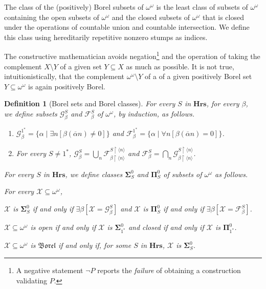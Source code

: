 \documentclass[a4paper]{amsart}
\theoremstyle{plain}
\newtheorem{definition}{Definition}
\begin{document}
The class of the (positively) Borel subsets of $\omega^\omega$ is the least class of subsets of $\omega^\omega$ containing the open subsets of $\omega^\omega$ and the closed subsets of $\omega^\omega$ that is  closed under the operations of countable union and countable intersection. We define this class using hereditarily repetitive nonzero stumps as indices.

The constructive mathematician avoids  negation\footnote{A negative statement $\neg P$ reports the {\it failure} of obtaining a construction validating $P$.} and the operation of taking the complement $X\setminus Y$ of a given set $Y\subseteq X$ as much as possible. It is not true, intuitionistically, that the complement $\omega^\omega\setminus Y$ of a of a given positively Borel set $Y\subseteq \omega^\omega$  is again positively Borel.

\begin{definition}[Borel sets and Borel classes] For every  $S$ in $\mathbf{Hrs}$, for every $\beta$, \\we define subsets $\mathcal{G}^S_\beta$ and $\mathcal{F}^S_\beta$ of $\omega^\omega$,  by induction, as follows.

\begin{enumerate}[\upshape (i)] \item $\mathcal{G}^{1^\ast}_\beta =\{\alpha\mid \exists n[\beta (\overline \alpha  n) \neq 0]\}$ and $\mathcal{F}^{1^\ast}_\beta =\{\alpha\mid \forall n[\beta (\overline\alpha n) = 0]\}$.

\item For every $S\neq 1^\ast$,
$\mathcal{G}^S_\beta = \bigcup_n \mathcal{F}^{S\upharpoonright\langle n \rangle }_{\beta\upharpoonright \langle n \rangle}$ and  $\mathcal{F}^S_\beta = \bigcap_n \mathcal{G}^{S\upharpoonright\langle n \rangle }_{\beta\upharpoonright \langle n \rangle}$.
\end{enumerate}
\smallskip
For  every $S$ in $\mathbf{Hrs}$, we define classes $\mathbf{\Sigma}^0_S$ and $\mathbf{\Pi}^0_S$ of subsets of $\omega^\omega$ as follows.

For every $\mathcal{X}\subseteq \omega^\omega$, 

$\mathcal{X}$ is  $\mathbf{\Sigma}^0_S$ if and only if $\exists \beta[\mathcal{X}=\mathcal{G}^S_\beta]$ and   $\mathcal{X}$ is  $\mathbf{\Pi}^0_S$ if and only if $\exists \beta[\mathcal{X}=\mathcal{F}^S_\beta]$.

\smallskip $\mathcal{X}\subseteq \omega^\omega$ is \emph{ open} if and only if $\mathcal{X}$ is $\mathbf{\Sigma}^0_{1^\ast}$ and \emph{ closed}   if and only if $\mathcal{X}$ is $\mathbf{\Pi}^0_{1^\ast}$.

\smallskip $\mathcal{X}\subseteq \omega^\omega$ is $\mathfrak{Borel}$ if and only if, for some $S$ in $\mathbf{Hrs}$, $\mathcal{X}$ is $\mathbf{\Sigma}^0_S$.
 \end{definition}
 
\end{document}
